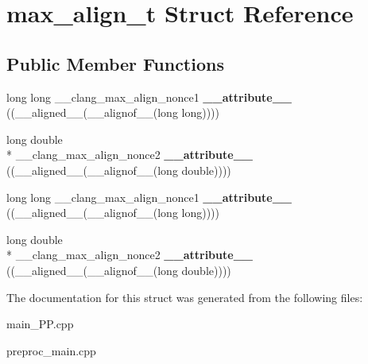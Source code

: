 \hypertarget{structmax__align__t}{\section{max\+\_\+align\+\_\+t Struct Reference}
\label{structmax__align__t}
}
\subsection*{Public Member Functions}
\begin{DoxyCompactItemize}
\item 
\hypertarget{structmax__align__t_a4962b3f5174cd6d1d26f0e7c27b29c0d}{long long \+\_\+\+\_\+clang\+\_\+max\+\_\+align\+\_\+nonce1 {\bfseries \+\_\+\+\_\+attribute\+\_\+\+\_\+} ((\+\_\+\+\_\+aligned\+\_\+\+\_\+(\+\_\+\+\_\+alignof\+\_\+\+\_\+(long long))))}\label{structmax__align__t_a4962b3f5174cd6d1d26f0e7c27b29c0d}

\item 
\hypertarget{structmax__align__t_af671ad5ae88de294ebf76b8803677991}{long double \\*
\+\_\+\+\_\+clang\+\_\+max\+\_\+align\+\_\+nonce2 {\bfseries \+\_\+\+\_\+attribute\+\_\+\+\_\+} ((\+\_\+\+\_\+aligned\+\_\+\+\_\+(\+\_\+\+\_\+alignof\+\_\+\+\_\+(long double))))}\label{structmax__align__t_af671ad5ae88de294ebf76b8803677991}

\item 
\hypertarget{structmax__align__t_a4962b3f5174cd6d1d26f0e7c27b29c0d}{long long \+\_\+\+\_\+clang\+\_\+max\+\_\+align\+\_\+nonce1 {\bfseries \+\_\+\+\_\+attribute\+\_\+\+\_\+} ((\+\_\+\+\_\+aligned\+\_\+\+\_\+(\+\_\+\+\_\+alignof\+\_\+\+\_\+(long long))))}\label{structmax__align__t_a4962b3f5174cd6d1d26f0e7c27b29c0d}

\item 
\hypertarget{structmax__align__t_af671ad5ae88de294ebf76b8803677991}{long double \\*
\+\_\+\+\_\+clang\+\_\+max\+\_\+align\+\_\+nonce2 {\bfseries \+\_\+\+\_\+attribute\+\_\+\+\_\+} ((\+\_\+\+\_\+aligned\+\_\+\+\_\+(\+\_\+\+\_\+alignof\+\_\+\+\_\+(long double))))}\label{structmax__align__t_af671ad5ae88de294ebf76b8803677991}

\end{DoxyCompactItemize}


The documentation for this struct was generated from the following files\+:\begin{DoxyCompactItemize}
\item 
main\+\_\+\+P\+P.\+cpp\item 
preproc\+\_\+main.\+cpp\end{DoxyCompactItemize}
